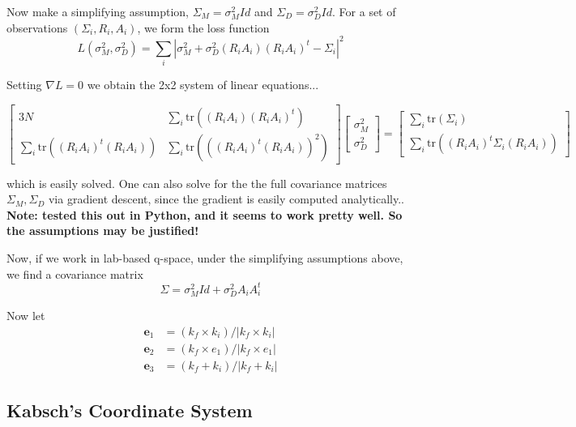 \documentclass[twocolumn,preprintnumbers,amsmath,amssymb]{revtex4}
\newcommand{\be}{\mathbf{e}}
\newcommand{\tr}{\mathrm{tr}}
\begin{document}
Now make a simplifying assumption, $\Sigma_M = \sigma_M^2 Id$ and $\Sigma_D = \sigma_D^2 Id$. For a set of observations $(\Sigma_i, R_i, A_i)$, we form the loss function
\begin{equation} L(\sigma_M^2, \sigma_D^2) = \sum_i |\sigma_M^2 + \sigma_D^2 (R_i A_i)(R_iA_i)^t - \Sigma_i|^2 \end{equation}

Setting $\nabla L = 0$ we obtain the 2x2 system of linear equations...

\begin{widetext}

\begin{equation} \begin{bmatrix}
  3N & \sum_i \tr( (R_iA_i)(R_i A_i)^t) \\
  \sum_i \tr((R_iA_i)^t(R_i A_i)) & \sum_i \tr(((R_i A_i)^t(R_iA_i))^2)
\end{bmatrix}
\begin{bmatrix} \sigma_M^2 \\ \sigma_D^2 \end{bmatrix}
=  \begin{bmatrix} \sum_i \tr(\Sigma_i) \\ \sum_i \tr((R_i A_i)^t \Sigma_i (R_i A_i)) \end{bmatrix}  \end{equation}
\end{widetext}
which is easily solved. One can also solve for the the full covariance matrices $\Sigma_M, \Sigma_D$ via gradient descent, since the gradient is easily computed analytically.. \textbf{Note: tested this out in Python, and it seems to work pretty well. So the assumptions may be justified!}

Now, if we work in lab-based q-space, under the simplifying assumptions above, we find a covariance matrix
\begin{equation} \Sigma = \sigma_M^2 Id + \sigma_D^2 A_i A_i^t \end{equation}

Now let
\begin{align}
  \be_1 &= (k_f \times k_i) / |k_f \times k_i| \\
  \be_2 &= (k_f \times e_1) / |k_f \times e_1| \\
  \be_3 &= (k_f + k_i) / |k_f + k_i|
\end{align}

\subsection{Kabsch's Coordinate System}
\end{document}
